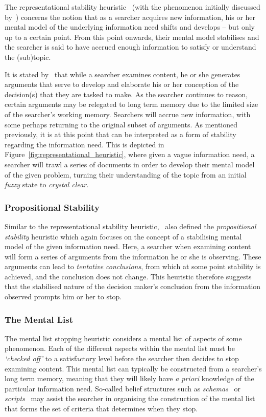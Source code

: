 The representational stability heuristic~\citep{nickles1995judgment} (with the phenomenon initially discussed by~\cite{yates1982toward}) concerns the notion that as a searcher acquires new information, his or her mental model of the underlying information need shifts and develops -- but only up to a certain point. From this point onwards, their mental model stabilises and the searcher is said to have accrued enough information to satisfy or understand the (sub)topic.

It is stated by~\cite{nickles1995judgment} that while a searcher examines content, he or she generates arguments that serve to develop and elaborate his or her conception of the decision(s) that they are tasked to make. As the searcher continues to reason, certain arguments may be relegated to long term memory due to the limited size of the searcher's working memory. Searchers will accrue new information, with some perhaps returning to the original subset of arguments. As mentioned previously, it is at this point that can be interpreted as a form of stability regarding the information need. This is depicted in Figure~\ref{fig:representational_heuristic}, where given a vague information need, a searcher will trawl a series of documents in order to develop their mental model of the given problem, turning their understanding of the topic from an initial \emph{fuzzy} state to \emph{crystal clear.}

\subsubsection{Propositional Stability}\label{sec:stopping_background:heuristics:propositional}
Similar to the representational stability heuristic,~\cite{nickles1995judgment} also defined the \emph{propositional stability} heuristic which again focuses on the concept of a stabilising mental model of the given information need. Here, a searcher when examining content will form a series of arguments from the information he or she is observing. These arguments can lead to \emph{tentative conclusions}, from which at some point stability is achieved, and the conclusion does not change. This heuristic therefore suggests that the stabilised nature of the decision maker's conclusion from the information observed prompts him or her to stop.

\subsubsection{The Mental List}\label{sec:stopping_background:heuristics:mental}
The mental list stopping heuristic considers a mental list of aspects of some phenomenon. Each of the different aspects within the mental list must be \emph{`checked off'} to a satisfactory level before the searcher then decides to stop examining content. This mental list can typically be constructed from a searcher's long term memory, meaning that they will likely have \emph{a priori} knowledge of the particular information need. So-called belief structures such as \emph{schemas}~\citep{bartlett1933remembering} or \emph{scripts}~\citep{schank1977scripts} may assist the searcher in organising the construction of the mental list that forms the set of criteria that determines when they stop.

